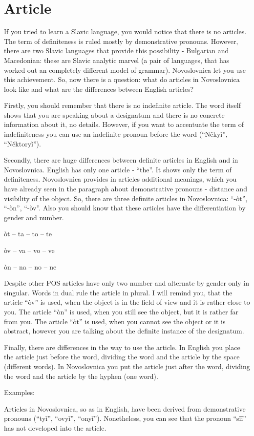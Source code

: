 \section{Article}

If you tried to learn a Slavic language, you would notice that there is no articles. The term of definiteness is ruled mostly by demonstrative pronouns. However, there are two Slavic languages that provide this possibility - Bulgarian and Macedonian: these are Slavic analytic marvel (a pair of languages, that has worked out an completely different model of grammar). Novoslovnica let you use this achievement. So, now there is a question: what do articles in Novoslovnica look like and what are the differences between English articles?

Firstly, you should remember that there is no indefinite article. The word itself shows that you are speaking about a designatum and there is no concrete information about it, no details. However, if you want to accentuate the term of indefiniteness you can use an indefinite pronoun before the word (“Někyǐ”, “Něktoryǐ”).

Secondly, there are huge differences between definite articles in English and in Novoslovnica. English has only one article - “the”. It shows only the term of definiteness. Novoslovnica provides in articles additional meanings, which you have already seen in the paragraph about demonstrative pronouns - distance and visibility of the object. So, there are three definite articles in Novoslovnica: “-òt”, “-òn”, “-òv”. Also you should know that these articles have the differentiation by gender and number. 

òt – ta – to – te

òv – va – vo – ve

òn – na – no – ne

Despite other POS articles have only two number and alternate by gender only in singular. Words in dual rule the article in plural. I will remind you, that the article “òv” is used, when the object is in the field of view and it is rather close to you. The article “òn” is used, when you still see the object, but it is rather far from you. The article “òt” is used, when you cannot see the object or it is abstract, however you are talking about the definite instance of the designatum.

Finally, there are differences in the way to use the article. In English you place the article just before the word, dividing the word and the article by the space (different words). In Novoslovnica you put the article just after the word, dividing the word and the article by the hyphen (one word).

Examples: 


Articles in Novoslovnica, so as in English, have been derived from demonstrative pronouns (“tyǐ”, “ovyǐ”, “onyǐ”). Nonetheless, you can see that the pronoun “sïǐ” has not developed into the article.
